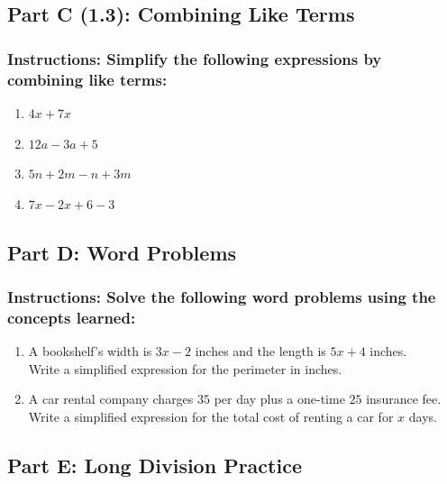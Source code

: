 \documentclass[12pt]{article}
\begin{document}
        \subsection*{Part C (1.3): Combining Like Terms}
            
            \subsubsection*{Instructions: Simplify the following expressions by combining like terms:}

                \begin{enumerate}
                    \item $4x + 7x$
                    \item $12a - 3a + 5$
                    \item $5n + 2m - n + 3m$
                    \item $7x - 2x + 6 - 3$
                \end{enumerate}
        
        \subsection*{Part D: Word Problems}
        
            \subsubsection*{Instructions: Solve the following word problems using the concepts learned:}

                \begin{enumerate}
                    \item A bookshelf's width is $3x - 2$ inches and the length is $5x + 4$ inches. \\ Write a simplified expression for the perimeter in inches.
                    \item A car rental company charges $35$ per day plus a one-time $25$ insurance fee. \\ Write a simplified expression for the total cost of renting a car for $x$ days.
                \end{enumerate}

        \subsection*{Part E: Long Division Practice}
        
\end{document}
